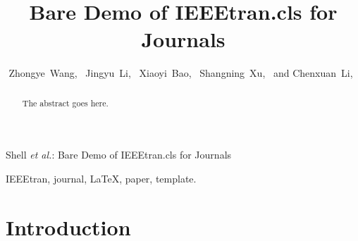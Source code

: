 \documentclass[journal,conference]{IEEEtran}
\begin{document}
%
\title{Bare Demo of IEEEtran.cls for Journals}
%
%
%

\author{
	Zhongye~Wang,~
	Jingyu~Li,~
	Xiaoyi~Bao,~
	Shangning~Xu,~
	and Chenxuan~Li,~
}

%
{Shell \MakeLowercase{\textit{et al.}}: Bare Demo of IEEEtran.cls for Journals}
%


\maketitle

\begin{abstract}
The abstract goes here.
\end{abstract}

\begin{IEEEkeywords}
IEEEtran, journal, \LaTeX, paper, template.
\end{IEEEkeywords}


\IEEEpeerreviewmaketitle



\section{Introduction}
\end{document}
